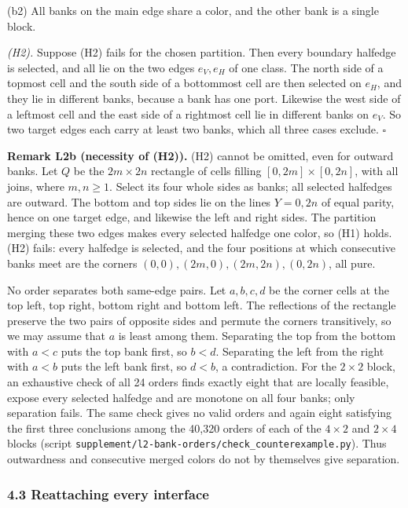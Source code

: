 \documentclass[
  11pt,
]{article}
\begin{document}
(b2) All banks on the main edge share a color, and the other bank is a
single block.

\emph{(H2).} Suppose (H2) fails for the chosen partition. Then every
boundary halfedge is selected, and all lie on the two edges \(e_V,e_H\)
of one class. The north side of a topmost cell and the south side of a
bottommost cell are then selected on \(e_H\), and they lie in different
banks, because a bank has one port. Likewise the west side of a leftmost
cell and the east side of a rightmost cell lie in different banks on
\(e_V\). So two target edges each carry at least two banks, which all
three cases exclude. \(\square\)

\textbf{Remark L2b (necessity of (H2)).} (H2) cannot be omitted, even
for outward banks. Let \(Q\) be the \(2m\times2n\) rectangle of cells
filling \([0,2m]\times[0,2n]\), with all joins, where \(m,n\ge1\).
Select its four whole sides as banks; all selected halfedges are
outward. The bottom and top sides lie on the lines \(Y=0,2n\) of equal
parity, hence on one target edge, and likewise the left and right sides.
The partition merging these two edges makes every selected halfedge one
color, so (H1) holds. (H2) fails: every halfedge is selected, and the
four positions at which consecutive banks meet are the corners
\((0,0),(2m,0),(2m,2n),(0,2n)\), all pure.

No order separates both same-edge pairs. Let \(a,b,c,d\) be the corner
cells at the top left, top right, bottom right and bottom left. The
reflections of the rectangle preserve the two pairs of opposite sides
and permute the corners transitively, so we may assume that \(a\) is
least among them. Separating the top from the bottom with \(a<c\) puts
the top bank first, so \(b<d\). Separating the left from the right with
\(a<b\) puts the left bank first, so \(d<b\), a contradiction. For the
\(2\times2\) block, an exhaustive check of all 24 orders finds exactly
eight that are locally feasible, expose every selected halfedge and are
monotone on all four banks; only separation fails. The same check gives
no valid orders and again eight satisfying the first three conclusions
among the 40,320 orders of each of the \(4\times2\) and \(2\times4\)
blocks (script
\texttt{supplement/l2-bank-orders/check\_counterexample.py}). Thus
outwardness and consecutive merged colors do not by themselves give
separation.

\subsubsection{4.3 Reattaching every
interface}\label{reattaching-every-interface}
\end{document}
